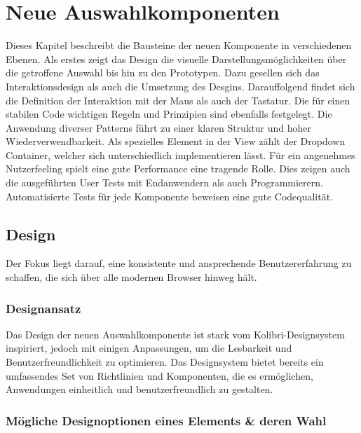 \chapter{Neue Auswahlkomponenten}
\label{chap:newComponent}

Dieses Kapitel beschreibt die Bausteine der neuen Komponente in verschiedenen Ebenen. 
Als erstes zeigt das Design die visuelle Darstellungsmöglichkeiten über die getroffene Auswahl bis hin zu den Prototypen. 
Dazu gesellen sich das Interaktionsdesign als auch die Umsetzung des Desgins. %
Darauffolgend findet sich die Definition der Interaktion mit der Maus als auch der Tastatur. 
Die für einen stabilen Code wichtigen Regeln und Prinzipien sind ebenfalls festgelegt. 
Die Anwendung diverser Patterns führt zu einer klaren Struktur und hoher Wiederverwendbarkeit. 
Als spezielles Element in der View zählt der Dropdown Container, welcher sich unterschiedlich implementieren lässt. 
Für ein angenehmes Nutzerfeeling spielt eine gute Performance eine tragende Rolle. 
Dies zeigen auch die ausgeführten User Tests mit Endanwendern als auch Programmierern. 
Automatisierte Tests für jede Komponente beweisen eine gute Codequalität. 


\section{Design}
\label{sec:design}

Der Fokus liegt darauf, eine konsistente und ansprechende Benutzererfahrung zu schaffen, die sich über alle modernen Browser hinweg hält. 


\subsection{Designansatz}
\label{sec:designIdea}

Das Design der neuen Auswahlkomponente ist stark vom Kolibri-Designsystem inspiriert, jedoch mit einigen Anpassungen, um die Lesbarkeit und Benutzerfreundlichkeit zu optimieren. 
Das Designsystem bietet bereits ein umfassendes Set von Richtlinien und Komponenten, die es ermöglichen, Anwendungen einheitlich und benutzerfreundlich zu gestalten. 


\subsection{Mögliche Designoptionen eines Elements \& deren Wahl}
\label{sec:possibleDesignOptions}

